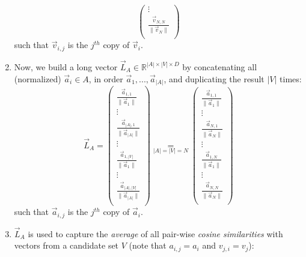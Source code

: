 \begin{enumerate}
\begin{equation*}
\begin{pmatrix}
                   \vdots\\ 
                   \frac{\vec{v}_{N, N}}{\lVert \vec{v}_N \rVert}\\
                   \end{pmatrix}
                   \end{equation*}
        such that $\vec{v}_{i, j}$ is the $j^{th}$ copy of $\vec{v}_i$.
    \item Now, we build a long vector $\vec{L}_{A} \in \mathbb{R}^{|A| \times |V| \times D}$ by concatenating all (normalized) $\vec{a}_i \in A$, in order $\vec{a}_1, ..., \vec{a}_{|A|}$, and duplicating the result $|V|$ times: \\
    \begin{equation*}
        \vec{L}_{A} = \begin{pmatrix}
                    \frac{\vec{a}_{1, 1}}{\lVert \vec{a}_1 \rVert}\\ 
                    \vdots\\ 
                    \frac{\vec{a}_{|A|, 1}}{\lVert \vec{a}_{|A|} \rVert}\\ 
                   \vdots\\ 
                   \frac{\vec{a}_{1, |V|}}{\lVert \vec{a}_{1} \rVert}\\ 
                   \vdots\\ 
                   \frac{\vec{a}_{|A|, |V|}}{\lVert \vec{a}_{|A|} \rVert}\\
                   \end{pmatrix}
                  \underset{\scriptscriptstyle |A| = |V| = N}{=} 
                  \begin{pmatrix}
                     \frac{\vec{a}_{1, 1}}{\lVert \vec{a}_1 \rVert}\\ 
                    \vdots\\ 
                    \frac{\vec{a}_{N, 1}}{\lVert \vec{a}_{N} \rVert}\\ 
                   \vdots\\ 
                   \frac{\vec{a}_{1, N}}{\lVert \vec{a}_{1} \rVert}\\ 
                   \vdots\\ 
                   \frac{\vec{a}_{N, N}}{\lVert \vec{a}_{N} \rVert}\\
                   \end{pmatrix}
                   \end{equation*}
       such that $\vec{a}_{i, j}$ is the $j^{th}$ copy of $\vec{a}_i$.
    \item $\vec{L}_{A}$ is used to capture the \textit{average} of all pair-wise \textit{cosine similarities} with vectors from a candidate set $V$ (note that $a_{i, j} = a_i$ and $v_{j, i} = v_j$):\\

\end{enumerate}
